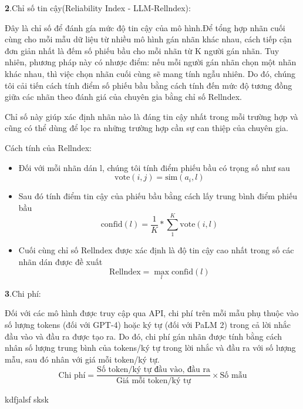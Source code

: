 \documentclass{article} %
\begin{document}
\textbf{2}.Chỉ số tin cậy(Reliability Index - LLM-Rellndex):

\noindent
Đây là chỉ số để đánh gía mức độ tin cậy của mô hình.Để tổng hợp nhãn cuối cùng cho mỗi mẫu dữ liệu từ nhiều mô hình gán nhãn khác nhau, 
cách tiếp cận đơn giản nhất là đếm số phiếu bầu cho mỗi nhãn từ K người gán nhãn. Tuy nhiên, phương pháp này có nhược điểm: 
nếu mỗi người gán nhãn chọn một nhãn khác nhau, thì việc chọn nhãn cuối cùng sẽ mang tính ngẫu nhiên.
Do đó, chúng tôi cải tiến cách tính điểm số phiếu bầu bằng cách tính đến mức độ tương đồng giữa các nhãn theo đánh giá của chuyên gia bằng chỉ số Rellndex.

Chỉ số này giúp xác định nhãn nào là đáng tin cậy nhất trong mỗi trường hợp và cũng có thể dùng để lọc ra những trường hợp cần sự can thiệp của chuyên gia.

Cách tính của Rellndex: 
\begin{itemize}
    \item Đối với mỗi nhãn dán l, chúng tôi tính điểm phiếu bầu có trọng số như sau \\
$$ \text{vote}(i, j) = \text{sim}(a_i, l) $$
    \item Sau đó tính điểm tin cậy của phiếu bầu bằng cách lấy trung bình điểm phiếu bầu\\
$$ \text{confid}(l) = \frac{1}{K} * \sum_{1}^{K}{\text{vote}(i, l)} $$
    \item Cuối cùng chỉ số Rellndex được xác định là độ tin cậy cao nhất trong số các nhãn dán được đề xuất\\
$$ \text{Rellndex} = \max_{l}{\text{confid}(l)} $$
\end{itemize}

\textbf{3}.Chi phí:

Đối với các mô hình được truy cập qua API, chi phí trên mỗi mẫu phụ thuộc vào số lượng tokens (đối với GPT-4) hoặc ký tự (đối với PaLM 2) 
trong cả lời nhắc đầu vào và đầu ra được tạo ra. Do đó, chi phí gán nhãn được tính bằng cách nhân số lượng trung bình của tokens/ký tự trong lời nhắc 
và đầu ra với số lượng mẫu, sau đó nhân với giá mỗi token/ký tự.
\[
\text{Chi phí} = \frac{\text{Số token/ký tự đầu vào, đầu ra}}{\text{Giá mỗi token/ký tự}} \times \text{Số mẫu}
\]

 kdfjalsf sksk
\end{document}
